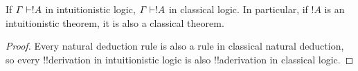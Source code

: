 \documentclass[../../../include/open-logic-section]{subfiles}
\begin{document}
\begin{prop}
  If $\Gamma \Proves !A$ in intuitionistic logic, $\Gamma \Proves !A$ in
  classical logic. In particular, if $!A$ is an intuitionistic
  theorem, it is also a classical theorem.
\end{prop}

\begin{proof}
  Every natural deduction rule is also a rule in classical natural
  deduction, so every !!{derivation} in intuitionistic logic is also
  !!a{derivation} in classical logic.
\end{proof}
\end{document}
